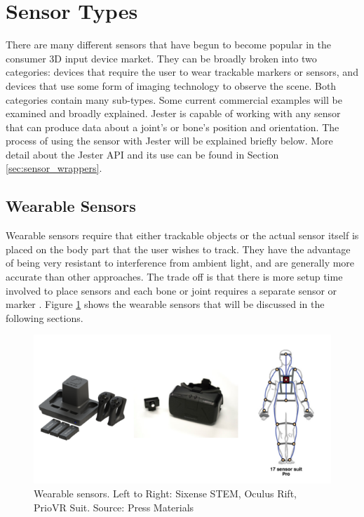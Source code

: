 \section{Sensor Types}

There are many different sensors that have begun to become popular in the consumer 3D input device market. They can be broadly broken into two categories: devices that require the user to wear trackable markers or sensors, and devices that use some form of imaging technology to observe the scene. Both categories contain many sub-types. Some current commercial examples will be examined and broadly explained. Jester is capable of working with any sensor that can produce data about a joint's or bone's position and orientation. The process of using the sensor with Jester will be explained briefly below. More detail about the Jester API and its use can be found in Section \ref{sec:sensor_wrappers}. 

\subsection{Wearable Sensors}\label{sec:wearables}

Wearable sensors require that either trackable objects or the actual sensor itself is placed on the body part that the user wishes to track. They have the advantage of being very resistant to interference from ambient light, and are generally more accurate than other approaches. The trade off is that there is more setup time involved to place sensors and each bone or joint requires a separate sensor or marker \cite{zhu2004real}. Figure \ref{fig:wearables} shows the wearable sensors that will be discussed in the following sections.

\begin{figure}[h]
\centering
\includegraphics[width=1\textwidth]{figures/wearables}
\caption{Wearable sensors. Left to Right: Sixense STEM, Oculus Rift, PrioVR Suit. Source: Press Materials \cite{sixense_stem, oculus2012oculus, priovr}}
\label{fig:wearables}
\end{figure}

